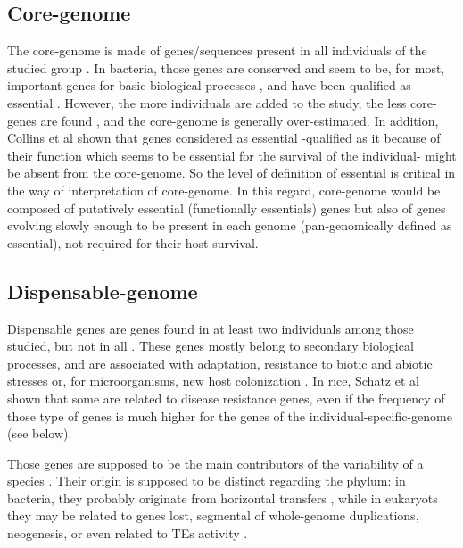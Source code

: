 \documentclass[a4paper,10pt,twoside]{report}
\begin{document}
\subsection{Core-genome}
The core-genome is made of genes/sequences present in all individuals of the studied group \cite{Lukjancenko2012,Lukjancenko2013,Soares2013}. In bacteria, those genes are conserved and seem to be, for most, important genes for basic biological processes \cite{Tettelin2005,Soares2013}, and have been qualified as essential \cite{Kahlke2013}. However, the more individuals are added to the study, the less core-genes are found  \cite{Tettelin2005,Lukjancenko2012}, and the core-genome is generally over-estimated.
In addition, Collins et al \cite{Collins2012} shown that genes considered as essential -qualified as it because of their function which seems to be essential for the survival of the individual- might be absent from the core-genome.  So the level of definition of essential is critical in the way of interpretation of core-genome. In this regard, core-genome would be composed of putatively essential (functionally essentials) genes but also of genes evolving slowly enough to be present in each genome (pan-genomically defined as essential), not required for their host survival.

\subsection{Dispensable-genome}
Dispensable genes are genes found in at least two individuals among those studied, but not in all \cite{Tettelin2005,Liang2012}. These genes mostly belong to secondary biological processes, and are associated with adaptation, resistance to biotic and abiotic stresses or, for microorganisms, new host colonization \cite{Tettelin2008,Mann2013,Hirsch2014}. In rice, Schatz et al \cite{Schatz2014} shown that some are related to disease resistance genes, even if the frequency of those type of genes is much higher for the genes of the individual-specific-genome (see below).

Those genes are supposed to be the main contributors of the variability of a species \cite{Kahlke2013}. Their origin is supposed to be distinct regarding the phylum: in bacteria, they probably originate from horizontal transfers \cite{Medini2005}, while in eukaryots they may be related to genes lost, segmental of whole-genome duplications, neogenesis, or even related to TEs activity \cite{Hirsch2014}. 
\end{document}
